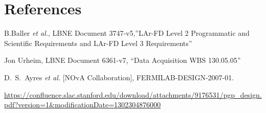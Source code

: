 
\section{References}

\begin{thebibliography}{99}

 B.Baller {\it et al.}, LBNE Document 3747-v5,''LAr-FD Level 2 Programmatic and
Scientific Requirements and LAr-FD Level 3 Requirements''

 Jon Urheim, LBNE Document 6361-v7, ``Data Acquisition WBS 130.05.05''

  D.~S.~Ayres {\it et al.}  [NOvA Collaboration],
  FERMILAB-DESIGN-2007-01.

\url{https://confluence.slac.stanford.edu/download/attachments/9176531/pgp_design.pdf?version=1&modificationDate=1302304876000}
	               
\end{thebibliography} 